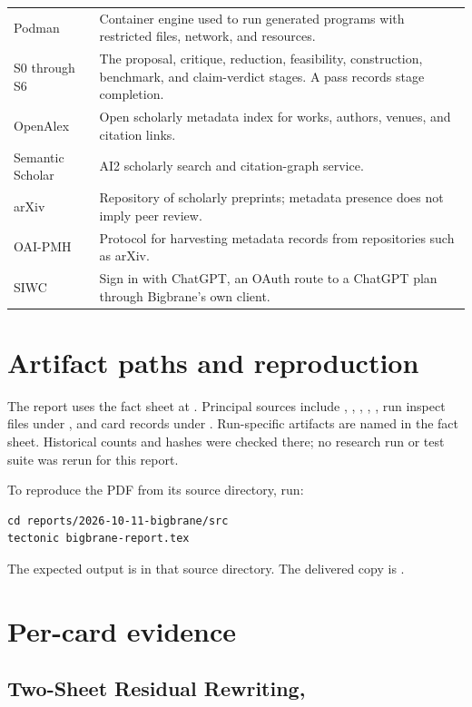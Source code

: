 \begin{longtable}{p{3.3cm}p{10.8cm}}
Podman & Container engine used to run generated programs with restricted files, network, and resources. \\
S0 through S6 & The proposal, critique, reduction, feasibility, construction, benchmark, and claim-verdict stages. A pass records stage completion. \\
OpenAlex & Open scholarly metadata index for works, authors, venues, and citation links. \\
Semantic Scholar & AI2 scholarly search and citation-graph service. \\
arXiv & Repository of scholarly preprints; metadata presence does not imply peer review. \\
OAI-PMH & Protocol for harvesting metadata records from repositories such as arXiv. \\
SIWC & Sign in with ChatGPT, an OAuth route to a ChatGPT plan through Bigbrane's own client. \\
\bottomrule
\end{longtable}

\section{Artifact paths and reproduction}

The report uses the fact sheet at . Principal sources include , , , , , run inspect files under , and card records under . Run-specific artifacts are named in the fact sheet. Historical counts and hashes were checked there; no research run or test suite was rerun for this report.

To reproduce the PDF from its source directory, run:
\begin{verbatim}
cd reports/2026-10-11-bigbrane/src
tectonic bigbrane-report.tex
\end{verbatim}
The expected output is  in that source directory. The delivered copy is .

\section{Per-card evidence}

\subsection{Two-Sheet Residual Rewriting, }

